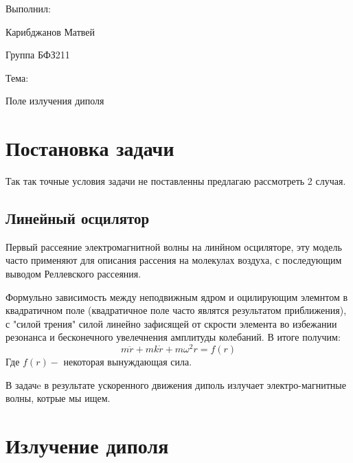 \documentclass[a4paper]{article}
\numberwithin{equation}{section}
\begin{document}
\begin{flushright}
    Выполнил:

    Карибджанов Матвей
    
    Группа БФЗ211

    Тема:

    Поле излучения диполя
\end{flushright}
\tableofcontents
{}
\pagestyle{main}
\pagecolor{mycolor}



\section{Постановка задачи}

Так так точные условия задачи не поставленны предлагаю рассмотреть 2 случая.

\subsection{Линейный осцилятор}
Первый рассеяние электромагнитной волны на линйном осциляторе, эту модель 
часто применяют для описания рассения на молекулах воздуха, с последующим 
выводом Реллевского рассеяния. 

Формульно зависимость между неподвижным ядром и оцилирующим элемнтом 
в квадратичном поле (квадратичное поле часто являтся результатом приближения), 
с "силой трения" силой линейно зафисящей от скрости элемента во избежании 
резонанса и бесконечного увелечнения амплитуды колебаний. В итоге получим:
\begin{equation}
    m\ddot r + mk \dot r + m\omega^2 r = f(r)
\end{equation}
Где $f(r)-$ некоторая вынуждающая сила.

В задачe в результате ускоренного движения диполь излучает 
электро-магнитные волны, котрые мы ищем.


\section{Излучение диполя}
\end{document}
